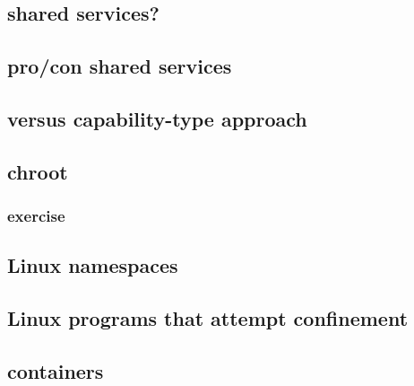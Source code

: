 \subsection{shared services?}


\subsection{pro/con shared services}



\subsection{versus capability-type approach}


\subsection{chroot}


\subsubsection{exercise}


\subsection{Linux namespaces}




\subsection{Linux programs that attempt confinement}


\subsection{containers}



